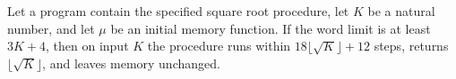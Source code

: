 \begin{theorem}
\label{Light.sqrt_meets}
\leanok
{}
Let a program contain the specified square root procedure, let $K$ be a natural number,
and let $\mu$ be an initial memory function. If the word limit is at least $3K+4$, then
on input $K$ the procedure runs within $18\lfloor\sqrt K\rfloor+12$ steps, returns
$\lfloor\sqrt K\rfloor$, and leaves memory unchanged.
\end{theorem}
